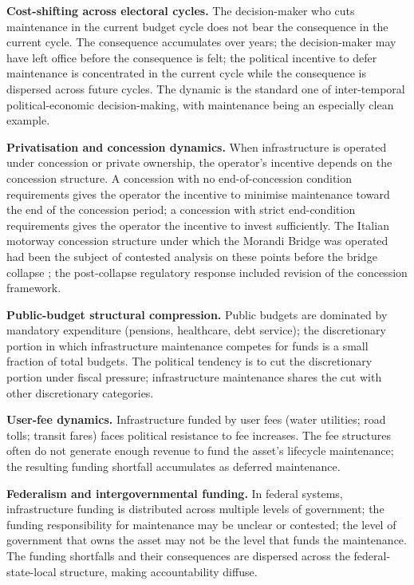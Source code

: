 \textbf{Cost-shifting across electoral cycles.} The decision-maker who cuts maintenance in the current budget cycle does not bear the consequence in the current cycle. The consequence accumulates over years; the decision-maker may have left office before the consequence is felt; the political incentive to defer maintenance is concentrated in the current cycle while the consequence is dispersed across future cycles. The dynamic is the standard one of inter-temporal political-economic decision-making, with maintenance being an especially clean example.

\textbf{Privatisation and concession dynamics.} When infrastructure is operated under concession or private ownership, the operator's incentive depends on the concession structure. A concession with no end-of-concession condition requirements gives the operator the incentive to minimise maintenance toward the end of the concession period; a concession with strict end-condition requirements gives the operator the incentive to invest sufficiently. The Italian motorway concession structure under which the Morandi Bridge was operated had been the subject of contested analysis on these points before the bridge collapse \cite{acc:mit-morandi-2018}; the post-collapse regulatory response included revision of the concession framework.

\textbf{Public-budget structural compression.} Public budgets are dominated by mandatory expenditure (pensions, healthcare, debt service); the discretionary portion in which infrastructure maintenance competes for funds is a small fraction of total budgets. The political tendency is to cut the discretionary portion under fiscal pressure; infrastructure maintenance shares the cut with other discretionary categories.

\textbf{User-fee dynamics.} Infrastructure funded by user fees (water utilities; road tolls; transit fares) faces political resistance to fee increases. The fee structures often do not generate enough revenue to fund the asset's lifecycle maintenance; the resulting funding shortfall accumulates as deferred maintenance.

\textbf{Federalism and intergovernmental funding.} In federal systems, infrastructure funding is distributed across multiple levels of government; the funding responsibility for maintenance may be unclear or contested; the level of government that owns the asset may not be the level that funds the maintenance. The funding shortfalls and their consequences are dispersed across the federal-state-local structure, making accountability diffuse.

